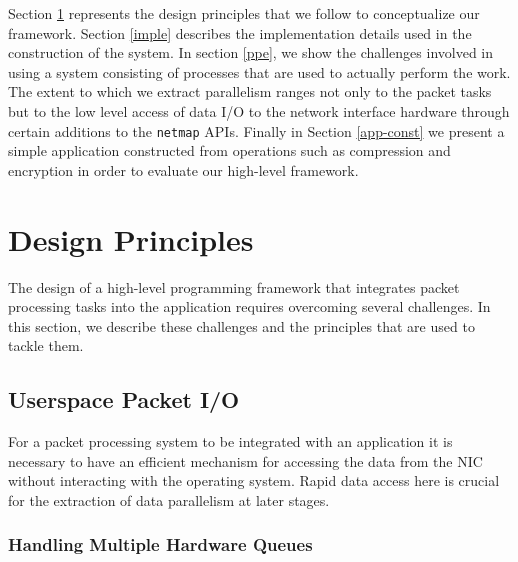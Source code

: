 \documentclass[conference]{IEEEtran}
\newcommand{\comment}[1]{}
\begin{document}
Section \ref{dppl} represents the design principles that we follow to conceptualize our framework. Section \ref{imple} describes the implementation details used in the construction of the system. In section \ref{ppe}, we show the challenges involved in using a system consisting of processes that are used to actually perform the work. The extent to which we extract parallelism ranges not only to the packet tasks but to the low level access of data I/O to the network interface hardware through certain additions to the \texttt{netmap} APIs. Finally in Section \ref{app-const} we present a simple application constructed from operations such as compression and encryption in order to evaluate our high-level framework.

\section{Design Principles}
\label{dppl}

The design of a high-level programming framework that integrates packet processing tasks into the application requires overcoming several challenges. \comment{The entire system is driven by the extent to which parallelism can be extracted. Some of the techniques that can be applied to the packet processing tasks can be used for the tasks related to the application.} In this section, we describe these challenges and the principles that are used to tackle them. \comment{We focus on the methodologies related to the packet processing tasks and the parallel processing engine itself.} 

\subsection{Userspace Packet I/O}

For a packet processing system to be integrated with an application it is necessary to have an efficient mechanism for accessing the data from the NIC without interacting with the operating system. Rapid data access here is crucial for the extraction of data parallelism at later stages. \comment{In using the techniques described below we exploit the modern NIC architecture to its full potential.}

\subsubsection{Handling Multiple Hardware Queues}
\end{document}
